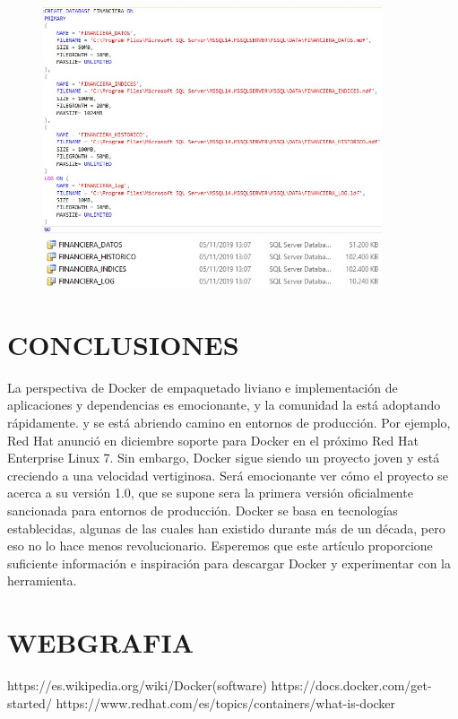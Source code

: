 \documentclass[preprint,12pt]{elsarticle}
\begin{document}
\begin{enumerate}[a)]
\begin{figure}[htb]
\begin{center}
		\includegraphics[width=10cm]{./IMAGENES/Docker14}
		\includegraphics[width=10cm]{./IMAGENES/Docker15}
	\end{center}
\end{figure}
\end{enumerate}



\section{CONCLUSIONES}
La perspectiva de Docker de empaquetado liviano e implementación de aplicaciones y dependencias es emocionante, y la comunidad la está adoptando rápidamente.
y se está abriendo camino en entornos de producción. Por ejemplo, Red Hat anunció en diciembre soporte para Docker en el próximo Red Hat Enterprise Linux 7.
Sin embargo, Docker sigue siendo un proyecto joven y está creciendo a una velocidad vertiginosa. Será emocionante ver cómo el proyecto se acerca a su versión 1.0, que se supone sera la primera versión oficialmente sancionada para entornos de producción. Docker se basa en tecnologías establecidas, algunas de las cuales han existido durante más de un década, pero eso no lo hace menos revolucionario. Esperemos que este artículo proporcione suficiente información e inspiración para descargar Docker y experimentar con la herramienta.

\section{WEBGRAFIA}
https://es.wikipedia.org/wiki/Docker(software)\newline
https://docs.docker.com/get-started/\newline
https://www.redhat.com/es/topics/containers/what-is-docker\newline
\end{document}

